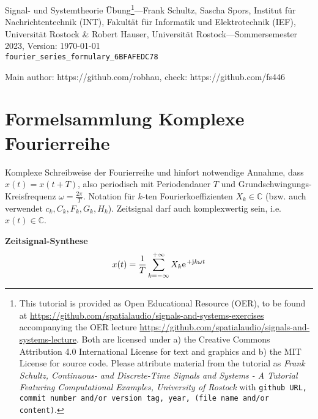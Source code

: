 \documentclass[11pt,a4paper,DIV=12]{scrartcl}
\begin{document}
%
\noindent Signal- und Systemtheorie Übung\footnote{This tutorial is provided as
Open Educational Resource (OER), to be found at
\url{https://github.com/spatialaudio/signals-and-systems-exercises}
accompanying the OER lecture
\url{https://github.com/spatialaudio/signals-and-systems-lecture}.
%
Both are licensed under a) the Creative Commons Attribution 4.0 International
License for text and graphics and b) the MIT License for source code.
%
Please attribute material from the tutorial as \textit{Frank Schultz,
Continuous- and Discrete-Time Signals and Systems - A Tutorial Featuring
Computational Examples, University of Rostock} with
\texttt{github URL, commit number and/or version tag, year, (file name and/or
content)}.}---Frank Schultz, Sascha Spors,
Institut für Nachrichtentechnik (INT),
Fakultät für Informatik und Elektrotechnik (IEF),
Universität Rostock \&
Robert Hauser, Universität Rostock---Sommersemester 2023, Version: \today\\
\verb|fourier_series_formulary_6BFAFEDC78|
%

\noindent Main author: https://github.com/robhau, check: https://github.com/fs446

\section*{Formelsammlung Komplexe Fourierreihe}

\noindent Komplexe Schreibweise der Fourierreihe und hinfort notwendige Annahme,
dass $x(t) = x(t+T)$, also periodisch mit Periodendauer $T$ und
Grundschwingungs-Kreisfrequenz $\omega=\frac{2\pi}{T}$.
Notation für $k$-ten Fourierkoeffizienten $X_k \in\mathbb{C}$
(bzw. auch verwendet $c_k, C_k, F_k, G_k, H_k$).
Zeitsignal darf auch komplexwertig sein, i.e. $x(t) \in\mathbb{C}$.

\textbf{Zeitsignal-Synthese}
\begin{align}
	x(t)=\frac{1}{T}\sum_{k=-\infty}^{+\infty}X_k\e^{+\im k \omega t}
\end{align}
\end{document}
